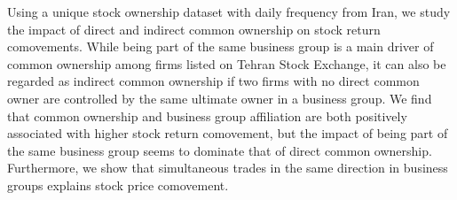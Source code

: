 Using a unique stock ownership dataset with daily frequency from Iran, we study the impact of direct and indirect common ownership on stock return comovements. While being part of the same business group is a main driver of common ownership among firms listed on Tehran Stock Exchange, it can also be regarded as indirect common ownership if two firms with no direct common owner are controlled by the same ultimate owner in a business group. We find that common ownership and business group affiliation are both positively associated with higher stock return comovement, but the impact of being part of the same business group seems to dominate that of direct common ownership. Furthermore, we show that simultaneous trades in the same direction in business groups explains stock price comovement.
